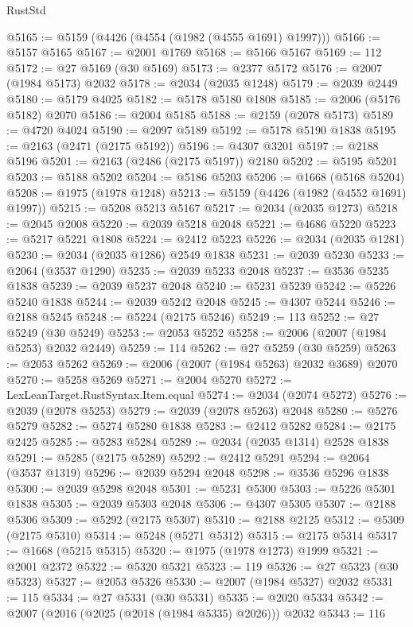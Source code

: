 \begin{lexlean}{RustStd}
\begin{coremodule}
@5165 := @5159 (@4426 (@4554 (@1982 (@4555 @1691) @1997)))
@5166 := @5157 @5165
@5167 := @2001 @1769
@5168 := @5166 @5167
@5169 := 112
@5172 := @27 @5169 (@30 @5169)
@5173 := @2377 @5172
@5176 := @2007 (@1984 @5173) @2032
@5178 := @2034 (@2035 @1248)
@5179 := @2039 @2449
@5180 := @5179 @4025
@5182 := @5178 @5180 @1808
@5185 := @2006 (@5176 @5182) @2070
@5186 := @2004 @5185
@5188 := @2159 (@2078 @5173)
@5189 := @4720 @4024
@5190 := @2097 @5189
@5192 := @5178 @5190 @1838
@5195 := @2163 (@2471 (@2175 @5192))
@5196 := @4307 @3201
@5197 := @2188 @5196
@5201 := @2163 (@2486 (@2175 @5197)) @2180
@5202 := @5195 @5201
@5203 := @5188 @5202
@5204 := @5186 @5203
@5206 := @1668 (@5168 @5204)
@5208 := @1975 (@1978 @1248)
@5213 := @5159 (@4426 (@1982 (@4552 @1691) @1997))
@5215 := @5208 @5213 @5167
@5217 := @2034 (@2035 @1273)
@5218 := @2045 @2008
@5220 := @2039 @5218 @2048
@5221 := @4686 @5220
@5223 := @5217 @5221 @1808
@5224 := @2412 @5223
@5226 := @2034 (@2035 @1281)
@5230 := @2034 (@2035 @1286) @2549 @1838
@5231 := @2039 @5230
@5233 := @2064 (@3537 @1290)
@5235 := @2039 @5233 @2048
@5237 := @3536 @5235 @1838
@5239 := @2039 @5237 @2048
@5240 := @5231 @5239
@5242 := @5226 @5240 @1838
@5244 := @2039 @5242 @2048
@5245 := @4307 @5244
@5246 := @2188 @5245
@5248 := @5224 (@2175 @5246)
@5249 := 113
@5252 := @27 @5249 (@30 @5249)
@5253 := @2053 @5252
@5258 := @2006 (@2007 (@1984 @5253) @2032 @2449)
@5259 := 114
@5262 := @27 @5259 (@30 @5259)
@5263 := @2053 @5262
@5269 := @2006 (@2007 (@1984 @5263) @2032 @3689) @2070
@5270 := @5258 @5269
@5271 := @2004 @5270
@5272 := LexLeanTarget.RustSyntax.Item.equal
@5274 := @2034 (@2074 @5272)
@5276 := @2039 (@2078 @5253)
@5279 := @2039 (@2078 @5263) @2048
@5280 := @5276 @5279
@5282 := @5274 @5280 @1838
@5283 := @2412 @5282
@5284 := @2175 @2425
@5285 := @5283 @5284
@5289 := @2034 (@2035 @1314) @2528 @1838
@5291 := @5285 (@2175 @5289)
@5292 := @2412 @5291
@5294 := @2064 (@3537 @1319)
@5296 := @2039 @5294 @2048
@5298 := @3536 @5296 @1838
@5300 := @2039 @5298 @2048
@5301 := @5231 @5300
@5303 := @5226 @5301 @1838
@5305 := @2039 @5303 @2048
@5306 := @4307 @5305
@5307 := @2188 @5306
@5309 := @5292 (@2175 @5307)
@5310 := @2188 @2125
@5312 := @5309 (@2175 @5310)
@5314 := @5248 (@5271 @5312)
@5315 := @2175 @5314
@5317 := @1668 (@5215 @5315)
@5320 := @1975 (@1978 @1273) @1999
@5321 := @2001 @2372
@5322 := @5320 @5321
@5323 := 119
@5326 := @27 @5323 (@30 @5323)
@5327 := @2053 @5326
@5330 := @2007 (@1984 @5327) @2032
@5331 := 115
@5334 := @27 @5331 (@30 @5331)
@5335 := @2020 @5334
@5342 := @2007 (@2016 (@2025 (@2018 (@1984 @5335) @2026))) @2032
@5343 := 116

\end{coremodule}
\end{lexlean}
